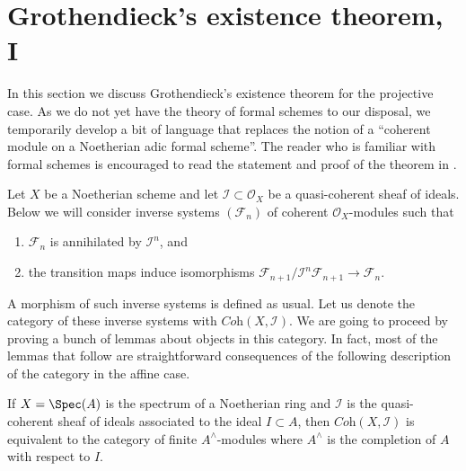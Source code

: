 \section{Grothendieck's existence theorem, I}
\label{section-existence}

\noindent
In this section we discuss Grothendieck's existence theorem for the
projective case. As we do not
yet have the theory of formal schemes to our disposal, we temporarily develop
a bit of language that replaces the notion of a ``coherent module on a
Noetherian adic formal scheme''. The reader who is familiar
with formal schemes is encouraged to read the statement and proof
of the theorem in \cite{EGA}.

\medskip\noindent
Let $X$ be a Noetherian scheme and let $\mathcal{I} \subset \mathcal{O}_X$
be a quasi-coherent sheaf of ideals. Below we will consider inverse
systems $(\mathcal{F}_n)$ of coherent $\mathcal{O}_X$-modules such that
\begin{enumerate}
\item $\mathcal{F}_n$ is annihilated by $\mathcal{I}^n$, and
\item the transition maps induce isomorphisms
$\mathcal{F}_{n + 1}/\mathcal{I}^n\mathcal{F}_{n + 1} \to \mathcal{F}_n$.
\end{enumerate}
A morphism of such inverse systems is defined as usual.
Let us denote the category of these inverse systems with
$\textit{Coh}(X, \mathcal{I})$. We are going to proceed by proving
a bunch of lemmas about objects in this category. In fact, most
of the lemmas that follow are straightforward consequences of the following
description of the category in the affine case.

\begin{lemma}
\label{lemma-inverse-systems-affine}
If $X = \Spec(A)$ is the spectrum of a Noetherian ring and
$\mathcal{I}$ is the quasi-coherent sheaf of ideals associated to the ideal
$I \subset A$, then $\textit{Coh}(X, \mathcal{I})$ is equivalent to the
category of finite $A^\wedge$-modules where $A^\wedge$ is the completion
of $A$ with respect to $I$.
\end{lemma}

